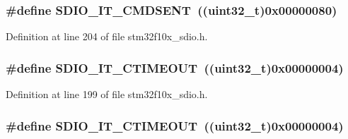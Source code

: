 \subsubsection[{\texorpdfstring{S\+D\+I\+O\+\_\+\+I\+T\+\_\+\+C\+M\+D\+S\+E\+NT}{SDIO_IT_CMDSENT}}]{\setlength{\rightskip}{0pt plus 5cm}\#define S\+D\+I\+O\+\_\+\+I\+T\+\_\+\+C\+M\+D\+S\+E\+NT~(({\bf uint32\+\_\+t})0x00000080)}\hypertarget{group___s_d_i_o___interrupt__sources_gaf9d8fc4651c4b7555fb9ee4e5af6ca63}{}\label{group___s_d_i_o___interrupt__sources_gaf9d8fc4651c4b7555fb9ee4e5af6ca63}


Definition at line 204 of file stm32f10x\+\_\+sdio.\+h.

\subsubsection[{\texorpdfstring{S\+D\+I\+O\+\_\+\+I\+T\+\_\+\+C\+T\+I\+M\+E\+O\+UT}{SDIO_IT_CTIMEOUT}}]{\setlength{\rightskip}{0pt plus 5cm}\#define S\+D\+I\+O\+\_\+\+I\+T\+\_\+\+C\+T\+I\+M\+E\+O\+UT~(({\bf uint32\+\_\+t})0x00000004)}\hypertarget{group___s_d_i_o___interrupt__sources_ga3c2fdef0993f10e65d4fddbdf71febed}{}\label{group___s_d_i_o___interrupt__sources_ga3c2fdef0993f10e65d4fddbdf71febed}


Definition at line 199 of file stm32f10x\+\_\+sdio.\+h.

\subsubsection[{\texorpdfstring{S\+D\+I\+O\+\_\+\+I\+T\+\_\+\+C\+T\+I\+M\+E\+O\+UT}{SDIO_IT_CTIMEOUT}}]{\setlength{\rightskip}{0pt plus 5cm}\#define S\+D\+I\+O\+\_\+\+I\+T\+\_\+\+C\+T\+I\+M\+E\+O\+UT~(({\bf uint32\+\_\+t})0x00000004)}\hypertarget{group___s_d_i_o___interrupt__sources_ga3c2fdef0993f10e65d4fddbdf71febed}{}\label{group___s_d_i_o___interrupt__sources_ga3c2fdef0993f10e65d4fddbdf71febed}


